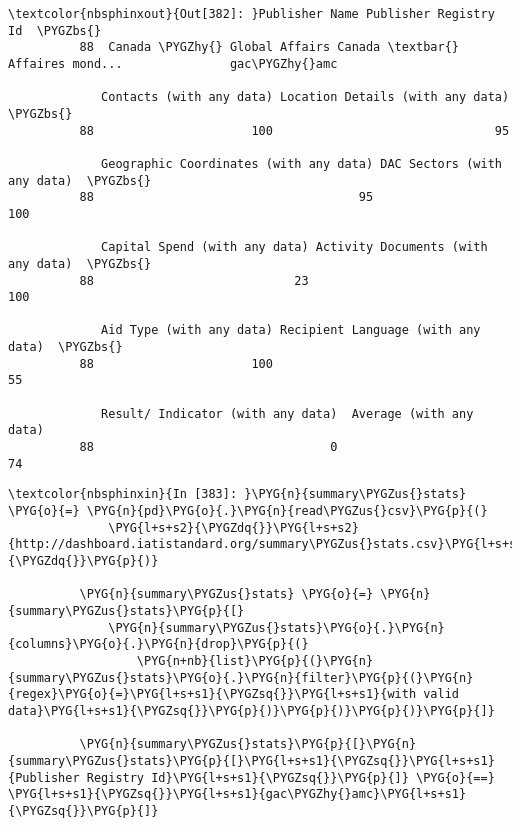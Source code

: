 \documentclass[letterpaper,10pt,english]{sphinxmanual}
\begin{document}
\begin{Verbatim}[commandchars=\\\{\}]
\textcolor{nbsphinxout}{Out[382]: }Publisher Name Publisher Registry Id  \PYGZbs{}
          88  Canada \PYGZhy{} Global Affairs Canada \textbar{} Affaires mond...               gac\PYGZhy{}amc
          
             Contacts (with any data) Location Details (with any data)  \PYGZbs{}
          88                      100                               95
          
             Geographic Coordinates (with any data) DAC Sectors (with any data)  \PYGZbs{}
          88                                     95                         100
          
             Capital Spend (with any data) Activity Documents (with any data)  \PYGZbs{}
          88                            23                                100
          
             Aid Type (with any data) Recipient Language (with any data)  \PYGZbs{}
          88                      100                                 55
          
             Result/ Indicator (with any data)  Average (with any data)
          88                                 0                       74
\end{Verbatim}

\begin{Verbatim}[commandchars=\\\{\}]
\textcolor{nbsphinxin}{In [383]: }\PYG{n}{summary\PYGZus{}stats} \PYG{o}{=} \PYG{n}{pd}\PYG{o}{.}\PYG{n}{read\PYGZus{}csv}\PYG{p}{(}
              \PYG{l+s+s2}{\PYGZdq{}}\PYG{l+s+s2}{http://dashboard.iatistandard.org/summary\PYGZus{}stats.csv}\PYG{l+s+s2}{\PYGZdq{}}\PYG{p}{)}
          
          \PYG{n}{summary\PYGZus{}stats} \PYG{o}{=} \PYG{n}{summary\PYGZus{}stats}\PYG{p}{[}
              \PYG{n}{summary\PYGZus{}stats}\PYG{o}{.}\PYG{n}{columns}\PYG{o}{.}\PYG{n}{drop}\PYG{p}{(}
                  \PYG{n+nb}{list}\PYG{p}{(}\PYG{n}{summary\PYGZus{}stats}\PYG{o}{.}\PYG{n}{filter}\PYG{p}{(}\PYG{n}{regex}\PYG{o}{=}\PYG{l+s+s1}{\PYGZsq{}}\PYG{l+s+s1}{with valid data}\PYG{l+s+s1}{\PYGZsq{}}\PYG{p}{)}\PYG{p}{)}\PYG{p}{)}\PYG{p}{]}
          
          \PYG{n}{summary\PYGZus{}stats}\PYG{p}{[}\PYG{n}{summary\PYGZus{}stats}\PYG{p}{[}\PYG{l+s+s1}{\PYGZsq{}}\PYG{l+s+s1}{Publisher Registry Id}\PYG{l+s+s1}{\PYGZsq{}}\PYG{p}{]} \PYG{o}{==} \PYG{l+s+s1}{\PYGZsq{}}\PYG{l+s+s1}{gac\PYGZhy{}amc}\PYG{l+s+s1}{\PYGZsq{}}\PYG{p}{]}
\end{Verbatim}
\end{document}
